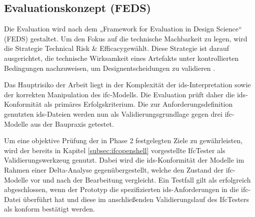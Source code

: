 \subsection{Evaluationskonzept (FEDS)}
\label{subsec:evaluation}
Die Evaluation wird nach dem „Framework for Evaluation in Design Science“ (FEDS) 
gestaltet.
Um den Fokus auf die technische Machbarkeit zu legen, wird die Strategie 
\glqq Technical Risk \& Efficacy\grqq gewählt.
Diese Strategie ist darauf ausgerichtet, die technische Wirksamkeit eines 
Artefakts unter kontrollierten Bedingungen nachzuweisen, um Designentscheidungen 
zu validieren \cite{venable2016feds}. 

Das Hauptrisiko der Arbeit liegt in der Komplexität der \gls{ids}-Interpretation 
sowie der korrekten Manipulation des \gls{ifc}-Modells.  
Die Evaluation prüft daher die \gls{ids}-Konformität als primäres Erfolgskriterium. 
Die zur Anforderungsdefinition genutzten \gls{ids}-Dateien werden nun als Validierungsgrundlage 
gegen drei \gls{ifc}-Modelle aus der Baupraxis getestet.

Um eine objektive Prüfung der in Phase 2 festgelegten Ziele zu gewährleisten, wird der 
bereits in Kapitel \ref{subsec:ifcopenshell} vorgestellte IfcTester als 
Validierungswerkzeug genutzt. Dabei wird die \gls{ids}-Konformität der Modelle im Rahmen einer 
Delta-Analyse gegenübergestellt, welche den Zustand der \gls{ifc}-Modelle vor und nach der Bearbeitung 
vergleicht. Ein Testfall gilt als erfolgreich abgeschlossen, wenn der Prototyp die 
spezifizierten \gls{ids}-Anforderungen in die \gls{ifc}-Datei überführt hat und diese 
im anschließenden Validierungslauf des IfcTesters als konform bestätigt werden.
